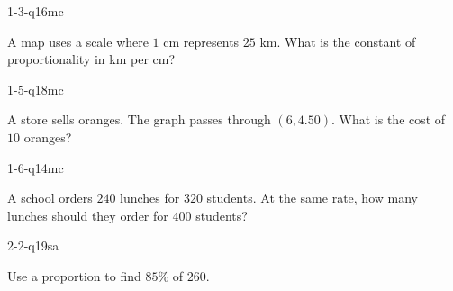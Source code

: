 
\begin{practiceQuestion}{1-3-q16}{mc}
\begin{questionText}
A map uses a scale where $1$ cm represents $25$ km. What is the constant of proportionality in km per cm?
\end{questionText}
\end{practiceQuestion}

\begin{practiceQuestion}{1-5-q18}{mc}
\begin{questionText}
A store sells oranges. The graph passes through $(6, 4.50)$. What is the cost of $10$ oranges?
\end{questionText}
\end{practiceQuestion}

\begin{practiceQuestion}{1-6-q14}{mc}
\begin{questionText}
A school orders $240$ lunches for $320$ students. At the same rate, how many lunches should they order for $400$ students?
\end{questionText}
\end{practiceQuestion}

\begin{practiceQuestion}{2-2-q19}{sa}
\begin{questionText}
Use a proportion to find $85\%$ of $260$.
\end{questionText}
\end{practiceQuestion}

